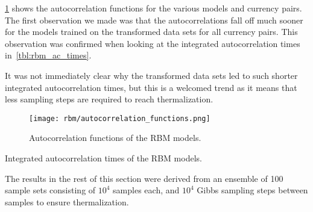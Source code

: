 \cref{fig:rbm_autocorrelation_functions} shows the autocorrelation functions for the various models and currency pairs.
The first observation we made was that the autocorrelations fall off much sooner for the models trained on the transformed data sets for all currency pairs.
This observation was confirmed when looking at the integrated autocorrelation times in~\cref{tbl:rbm_ac_times}.

It was not immediately clear why the transformed data sets led to such shorter integrated autocorrelation times, but this is a welcomed trend as it means that less sampling steps are required to reach thermalization.
\begin{figure}[!htb]
    \begin{center}
        \texttt{[image: rbm/autocorrelation\_functions.png]}
    \end{center}
    \caption{
        Autocorrelation functions of the RBM models.
    }
    \label{fig:rbm_autocorrelation_functions}
\end{figure}
\begin{table}[!htb]
    \centering
    \begin{adjustbox}{max width=\textwidth}
        
    \end{adjustbox}
    \caption{
        Integrated autocorrelation times of the RBM models.
    }
    \label{tbl:rbm_ac_times}
\end{table}

The results in the rest of this section were derived from an ensemble of 100 sample sets consisting of \( 10^4 \) samples each, and \( 10^4 \) Gibbs sampling steps between samples to ensure thermalization.

